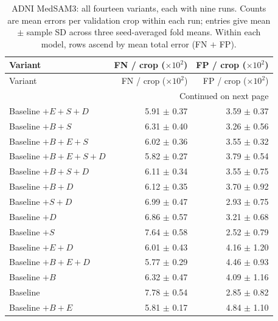 \documentclass[12pt,a4paper]{article}
\begin{document}
\begingroup\footnotesize{}
\setlength{\tabcolsep}{4pt}
\renewcommand{\arraystretch}{1.12}
\begin{longtable}{@{}lrr@{}}
\caption{ADNI MedSAM3: all fourteen variants, each with nine runs. Counts are mean errors per validation crop within each run; entries give mean $\pm$ sample SD across three seed-averaged fold means. Within each model, rows ascend by mean total error (FN $+$ FP).}
\label{tab:medsam-adni-all-errors}\\
\hline
Variant & \shortstack{FN / crop\\($\times 10^{2}$)} & \shortstack{FP / crop\\($\times 10^{2}$)} \\ \hline
\endfirsthead
\hline
Variant & \shortstack{FN / crop\\($\times 10^{2}$)} & \shortstack{FP / crop\\($\times 10^{2}$)} \\ \hline
\endhead
\hline
\multicolumn{3}{r}{Continued on next page}\\
\endfoot
\hline\endlastfoot
Baseline $+E+S+D$ & 5.91 $\pm$ 0.37 & 3.59 $\pm$ 0.37 \\
Baseline $+B+S$ & 6.31 $\pm$ 0.40 & 3.26 $\pm$ 0.56 \\
Baseline $+B+E+S$ & 6.02 $\pm$ 0.36 & 3.55 $\pm$ 0.32 \\
Baseline $+B+E+S+D$ & 5.82 $\pm$ 0.27 & 3.79 $\pm$ 0.54 \\
Baseline $+B+S+D$ & 6.11 $\pm$ 0.34 & 3.55 $\pm$ 0.75 \\
Baseline $+B+D$ & 6.12 $\pm$ 0.35 & 3.70 $\pm$ 0.92 \\
Baseline $+S+D$ & 6.99 $\pm$ 0.47 & 2.93 $\pm$ 0.75 \\
Baseline $+D$ & 6.86 $\pm$ 0.57 & 3.21 $\pm$ 0.68 \\
Baseline $+S$ & 7.64 $\pm$ 0.58 & 2.52 $\pm$ 0.79 \\
Baseline $+E+D$ & 6.01 $\pm$ 0.43 & 4.16 $\pm$ 1.20 \\
Baseline $+B+E+D$ & 5.77 $\pm$ 0.29 & 4.46 $\pm$ 0.93 \\
Baseline $+B$ & 6.32 $\pm$ 0.47 & 4.09 $\pm$ 1.16 \\
Baseline & 7.78 $\pm$ 0.54 & 2.85 $\pm$ 0.82 \\
Baseline $+B+E$ & 5.81 $\pm$ 0.17 & 4.84 $\pm$ 1.10 \\
\end{longtable}
\endgroup
\FloatBarrier
\end{document}
